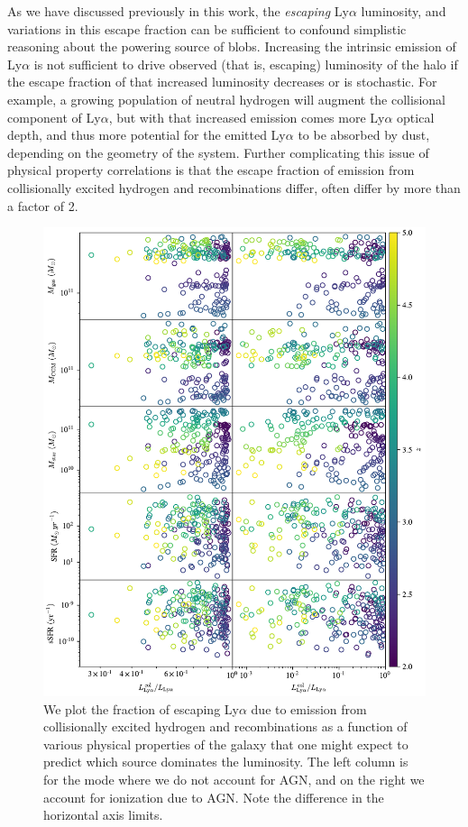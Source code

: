 As we have discussed previously in this work, the {\it escaping} Ly$\alpha$ luminosity, and variations in this escape fraction can be sufficient to confound simplistic reasoning about the powering source of blobs.
Increasing the intrinsic emission of Ly$\alpha$ is not sufficient to drive observed (that is, escaping) luminosity of the halo if the escape fraction of that increased luminosity decreases or is stochastic.
For example, a growing population of neutral hydrogen will augment the collisional component of Ly$\alpha$, but with that increased emission comes more Ly$\alpha$ optical depth, and thus more potential for the emitted Ly$\alpha$ to be absorbed by dust, depending on the geometry of the system.
Further complicating this issue of physical property correlations is that the escape fraction of emission from collisionally excited hydrogen and recombinations differ, often differ by more than a factor of 2.
\begin{figure}
    \centering
    \includegraphics[width=\textwidth,height=\textheight,keepaspectratio]{figures/appendix_correlations.pdf}
    \caption{
        We plot the fraction of escaping Ly$\alpha$ due to emission from collisionally excited hydrogen and recombinations as a function of various physical properties of the galaxy that one might expect to predict which source dominates the luminosity.
        The left column is for the mode where we do not account for AGN, and on the right we account for ionization due to AGN.
        Note the difference in the horizontal axis limits.
    }
    \label{fig:appendix_correlations}
\end{figure}
